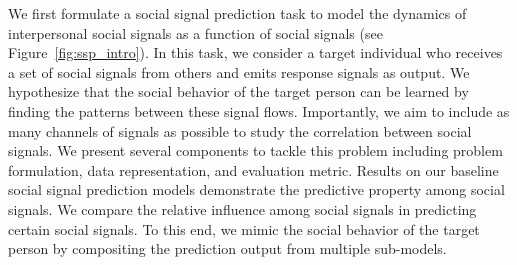 We first formulate a social signal prediction task to model the dynamics of interpersonal social signals as a function of social signals (see Figure~\ref{fig:ssp_intro}). In this task, we consider a target individual who receives a set of social signals from others and emits response signals as output. We hypothesize that the social behavior of the target person can be learned by finding the patterns between these signal flows. Importantly, we aim to include as many channels of signals as possible to study the correlation between social signals. We present several components to tackle this problem including problem formulation, data representation, and evaluation metric. Results on our baseline social signal prediction models demonstrate the predictive property among social signals. We compare the relative influence among social signals in predicting certain social signals. To this end, we mimic the social behavior of the target person by compositing the prediction output from multiple sub-models.

%



